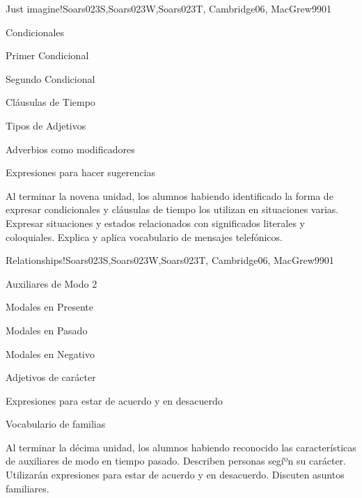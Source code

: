 \begin{syllabus}
\begin{unit}{Just imagine!}{Soars023S,Soars023W,Soars023T, Cambridge06, MacGrew99}{0}{1}
   \begin{topics}
      \item Condicionales
      \item Primer Condicional
      \item Segundo Condicional
      \item Cláusulas de Tiempo
      \item Tipos de Adjetivos
      \item Adverbios como modificadores
      \item Expresiones para hacer sugerencias
   \end{topics}

   \begin{unitgoals}
      \item Al terminar la novena unidad, los alumnos habiendo identificado la forma de expresar condicionales y cláusulas de tiempo los utilizan en situaciones varias. Expresar situaciones y estados relacionados con significados literales y coloquiales. Explica y aplica vocabulario de mensajes telefónicos.
   \end{unitgoals}

\end{unit}

\begin{unit}{Relationships!}{Soars023S,Soars023W,Soars023T, Cambridge06, MacGrew99}{0}{1}
   \begin{topics}
      \item Auxiliares de Modo 2
      \item Modales en Presente
      \item Modales en Pasado
      \item Modales en Negativo
      \item Adjetivos de carácter
      \item Expresiones para estar de acuerdo y en desacuerdo
      \item Vocabulario de familias
   \end{topics}

   \begin{unitgoals}
      \item Al terminar la décima unidad, los alumnos habiendo reconocido las características  de auxiliares de modo en tiempo pasado. Describen personas segíºn su carácter. Utilizarán expresiones para estar de acuerdo y en desacuerdo. Discuten asuntos familiares. 
   \end{unitgoals}


\end{unit}
\end{syllabus}
